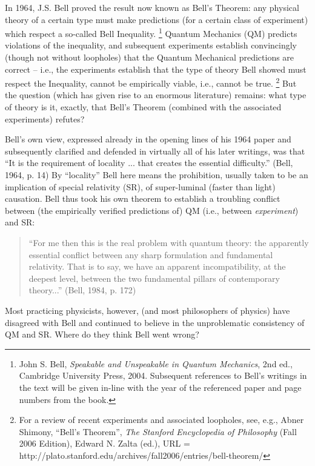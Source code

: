 \documentclass[aps,prc,twocolumn]{revtex4}
\begin{document}
In 1964, J.S. Bell proved the result now known as Bell's
Theorem:  any physical theory of a certain
type must make predictions (for a certain class of experiment) which
respect a so-called Bell Inequality.  
\footnote{John S. Bell, \emph{Speakable and Unspeakable in Quantum
    Mechanics}, 2nd ed., Cambridge University Press, 2004.  Subsequent
  references to Bell's writings in the text will be given in-line with
  the year of the referenced paper and page numbers from the book.}
Quantum Mechanics (QM) predicts
violations of the inequality, and subsequent
experiments establish convincingly (though not without loopholes) that
the Quantum Mechanical predictions are correct -- i.e., the
experiments establish that 
the type of theory Bell showed must respect the Inequality, cannot be
empirically viable, i.e., cannot be true.  
\footnote{For a review of recent experiments and associated loopholes,
  see, e.g., Abner Shimony, ``Bell's Theorem'', \emph{The Stanford
  Encyclopedia of Philosophy} (Fall 2006 Edition), Edward N. Zalta
(ed.), URL = http://plato.stanford.edu/archives/fall2006/entries/bell-theorem/}
But the
question (which has given rise to an enormous literature) remains:
what type of theory is it, exactly, that Bell's Theorem (combined with
the associated experiments) refutes?

Bell's own view, expressed already in the opening lines of his 1964
paper and subsequently clarified and defended in virtually all of his
later writings, was that ``It is the requirement of locality ...
that creates the essential difficulty.''  (Bell, 1964, p. 14)
By ``locality'' Bell here means 
the prohibition, usually taken to be an implication of
special relativity (SR), of super-luminal (faster than light) 
causation.  Bell thus 
took his own theorem to establish a troubling conflict between (the
empirically verified predictions of) QM (i.e.,
between \emph{experiment}) and SR:
\begin{quote}
``For me then this is the real problem with quantum theory:  the
apparently essential conflict between any sharp formulation and
fundamental relativity.  That is to say, we have an apparent
incompatibility, at the deepest level, between the two fundamental
pillars of contemporary theory...'' (Bell, 1984, p. 172)
\end{quote}
Most practicing physicists, however, (and most philosophers of
physics) have disagreed with Bell and continued to believe in the
unproblematic consistency of QM and SR.  Where do they think Bell went
wrong?  
\end{document}
